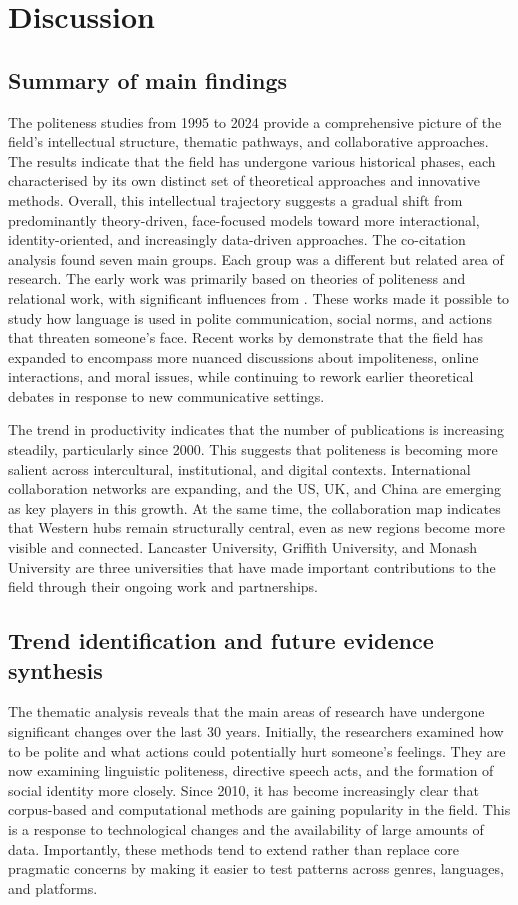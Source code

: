 \documentclass[english]{textolivre}
\begin{document}
\section{Discussion}
\subsection{Summary of main findings}
The politeness studies from 1995 to 2024 provide a comprehensive picture of the field’s intellectual structure, thematic pathways, and collaborative approaches. The results indicate that the field has undergone various historical phases, each characterised by its own distinct set of theoretical approaches and innovative methods. Overall, this intellectual trajectory suggests a gradual shift from predominantly theory-driven, face-focused models toward more interactional, identity-oriented, and increasingly data-driven approaches. The co-citation analysis found seven main groups. Each group was a different but related area of research. The early work was primarily based on theories of politeness and relational work, with significant influences from \textcite{watts2003, culpeper2011a, brown1987}. These works made it possible to study how language is used in polite communication, social norms, and actions that threaten someone’s face. Recent works by \textcite{culpeper2021, kadar2017b} demonstrate that the field has expanded to encompass more nuanced discussions about impoliteness, online interactions, and moral issues, while continuing to rework earlier theoretical debates in response to new communicative settings.

The trend in productivity indicates that the number of publications is increasing steadily, particularly since 2000. This suggests that politeness is becoming more salient across intercultural, institutional, and digital contexts. International collaboration networks are expanding, and the US, UK, and China are emerging as key players in this growth. At the same time, the collaboration map indicates that Western hubs remain structurally central, even as new regions become more visible and connected. Lancaster University, Griffith University, and Monash University are three universities that have made important contributions to the field through their ongoing work and partnerships.

\subsection{Trend identification and future evidence synthesis}
The thematic analysis reveals that the main areas of research have undergone significant changes over the last 30 years. Initially, the researchers examined how to be polite and what actions could potentially hurt someone’s feelings. They are now examining linguistic politeness, directive speech acts, and the formation of social identity more closely. Since 2010, it has become increasingly clear that corpus-based and computational methods are gaining popularity in the field. This is a response to technological changes and the availability of large amounts of data. Importantly, these methods tend to extend rather than replace core pragmatic concerns by making it easier to test patterns across genres, languages, and platforms.
\end{document}
